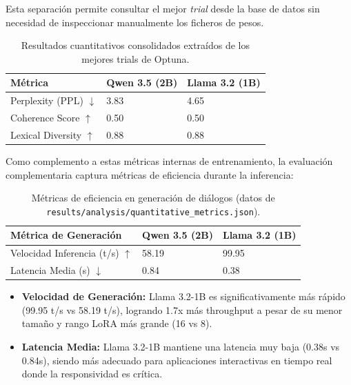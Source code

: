 Esta separación permite consultar el mejor \textit{trial} desde la base de datos sin necesidad de inspeccionar manualmente los ficheros de pesos.

\begin{table}[H]
    \centering
    \begin{tabularx}{\textwidth}{|l|X|X|}
        \hline
        \textbf{Métrica}          & \textbf{Qwen 3.5 (2B)}  & \textbf{Llama 3.2 (1B)}    \\ \hline
        Perplexity (PPL) $\downarrow$ & 3.83                    & 4.65                          \\ \hline
        Coherence Score $\uparrow$    & 0.50                    & 0.50                          \\ \hline
        Lexical Diversity $\uparrow$ & 0.88                    & 0.88                          \\ \hline
    \end{tabularx}
    \caption{Resultados cuantitativos consolidados extraídos de los mejores trials de Optuna.}
    \label{tab:metricas_optuna_final}
\end{table}

Como complemento a estas métricas internas de entrenamiento, la evaluación complementaria captura métricas de eficiencia durante la inferencia:

\begin{table}[H]
    \centering
    \begin{tabularx}{\textwidth}{|l|X|X|}
        \hline
        \textbf{Métrica de Generación} & \textbf{Qwen 3.5 (2B)} & \textbf{Llama 3.2 (1B)} \\ \hline
        Velocidad Inferencia (t/s) $\uparrow$ & 58.19           & 99.95                   \\ \hline
        Latencia Media (s) $\downarrow$      & 0.84            & 0.38                    \\ \hline
    \end{tabularx}
    \caption{Métricas de eficiencia en generación de diálogos (datos de \texttt{results/analysis/quantitative\_metrics.json}).}
    \label{tab:benchmark_eficiencia}
\end{table}

\begin{itemize}
    \item \textbf{Velocidad de Generación:} Llama 3.2-1B es significativamente más rápido (99.95 t/s vs 58.19 t/s), logrando 1.7x más throughput a pesar de su menor tamaño y rango LoRA más grande (16 vs 8).
    \item \textbf{Latencia Media:} Llama 3.2-1B mantiene una latencia muy baja (0.38s vs 0.84s), siendo más adecuado para aplicaciones interactivas en tiempo real donde la responsividad es crítica.
\end{itemize}

